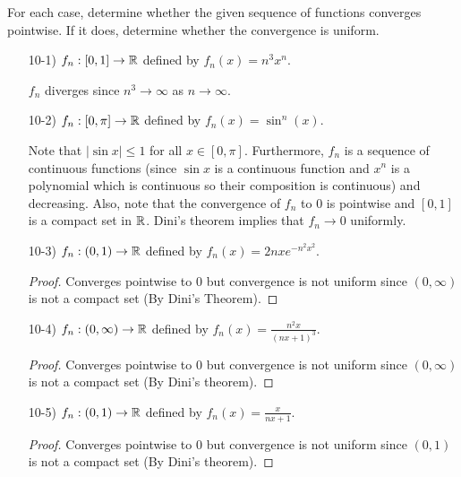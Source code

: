 \documentclass[a4paper]{article}
\begin{document}
\begin{problem}
    For each case, determine whether the given sequence of functions converges pointwise. If it does, determine whether the convergence is uniform.
\end{problem}
\begin{enumerate}
    \item[10-1)] \( {f}_{n}: [0,1] \to \mathbb{R}  \) defined by \( {f}_{n}(x) = n^{3} x^{n} \).
        \begin{solution}
        \( {f}_{n}  \) diverges since \( n^{3} \to \infty   \) as \( n \to \infty  \).
        \end{solution}
    \item[10-2)] \( {f}_{n}: [0,\pi] \to \mathbb{R}  \) defined by \( {f}_{n}(x) = \sin^{n}(x) \).
        \begin{solution}
            Note that \( | \sin x  | \leq 1  \) for all \( x \in [0,\pi]  \). Furthermore, \( {f}_{n} \) is a sequence of continuous functions (since \( \sin x  \) is a continuous function and \( x^{n} \) is a polynomial which is continuous so their composition is continuous) and decreasing.  Also, note that the convergence of \( {f}_{n} \) to \( 0  \) is pointwise and \( [0,1] \) is a compact set in \( \mathbb{R}  \). Dini's theorem implies that \( {f}_{n} \to 0  \) uniformly.
        \end{solution}
    \item[10-3)] \( {f}_{n}: (0,1) \to \mathbb{R}  \) defined by \( {f}_{n}(x) = 2nx e^{- n^{2} x^{2}} \).
        \begin{proof}
        Converges pointwise to \( 0  \) but convergence is not uniform since \( (0,\infty ) \) is not a compact set (By Dini's Theorem).
        \end{proof}
    \item[10-4)] \( {f}_{n}: (0,\infty) \to \mathbb{R}   \) defined by \( {f}_{n}(x) = \frac{ n^{2} x }{ (nx + 1)^{3} }  \).
        \begin{proof}
        Converges pointwise to \( 0  \) but convergence is not uniform since \( (0,\infty) \) is not a compact set (By Dini's theorem).
        \end{proof}
    \item[10-5)] \( {f}_{n}: (0,1) \to \mathbb{R}  \) defined by \( {f}_{n}(x) = \frac{ x  }{ nx + 1 }  \).
        \begin{proof}
        Converges pointwise to \( 0  \) but convergence is not uniform since \( (0,1) \) is not a compact set (By Dini's theorem).
        \end{proof}

\end{enumerate}
\end{document}
